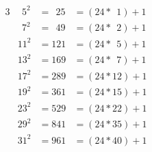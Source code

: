 \begin{alignat*}{3}
&~~5^2&=~~25&=(24*~~1)+1\\
&~~7^2&=~~49&=(24*~~2)+1\\
&11^2&=121&=(24*~~5)+1\\
&13^2&=169&=(24*~~7)+1\\
&17^2&=289&=(24*12)+1\\
&19^2&=361&=(24*15)+1\\
&23^2&=529&=(24*22)+1\\
&29^2&=841&=(24*35)+1\\
&31^2&=961&=(24*40)+1
\end{alignat*}
